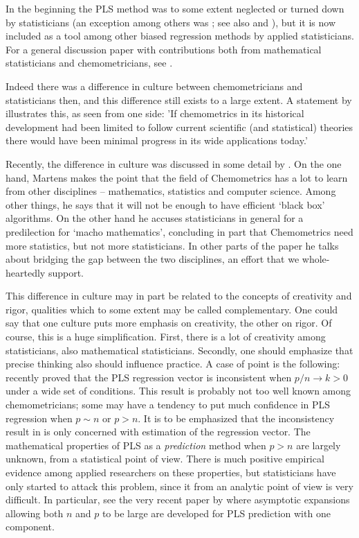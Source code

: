 \documentclass[num-refs]{wiley-article}
\begin{document}
In the beginning the PLS method was to some extent neglected or turned down by statisticians (an exception among others was \citep{frank1993statistical}; see also \citet{helland1988structure} and \citet{helland1990partial}), but it is now included as a tool among other biased regression methods by applied statisticians. For a general discussion paper with contributions both from mathematical statisticians and chemometricians, see \citet{sundberg1999multivariate}.

Indeed there was a difference in culture between chemometricians and statisticians then, and this difference still exists to a large extent. A statement by  \citet{munck2010physiochemical} illustrates this, as seen from one side: 'If chemometrics in its historical development had been limited to follow current scientific (and statistical) theories there would have been minimal progress in its wide applications today.'

Recently, the difference in culture was discussed in some detail by \citet{martens2015bigdata}. On the one hand, Martens makes the point that the field of Chemometrics has a lot to learn from other disciplines -- mathematics, statistics and computer science. Among other things, he says that it will not be enough to have efficient `black box' algorithms. On the other hand he accuses statisticians in general for a predilection for `macho mathematics', concluding in part that Chemometrics need more statistics, but not more statisticians. In other parts of the paper he talks about bridging the gap between the two disciplines, an effort that we whole-heartedly support.

This difference in culture may in part be related to the concepts of creativity and rigor, qualities which to some extent may be called complementary. One could say that one culture puts more emphasis on creativity, the other on rigor. Of course, this is a huge simplification. First, there is a lot of creativity among statisticians, also mathematical statisticians. Secondly, one should emphasize that precise thinking also should influence practice. A case of point is the following:   \citet{chung2010sparse} recently proved that the PLS regression vector is inconsistent when $p/n\rightarrow k>0$  under a wide set of conditions. This result is probably not too well known among chemometricians; some may have a tendency to put much confidence in PLS regression when $p\sim n$ or $p>n$. It is to be emphasized that the inconsistency result in \citep{chung2010sparse} is only concerned with estimation of the regression vector. The mathematical properties of PLS as a \emph{prediction} method when $p>n$ are largely unknown, from a statistical point of view. There is much positive empirical evidence among applied researchers on these properties, but statisticians have only started to attack this problem, since it from an analytic point of view is very difficult. In particular, see the very recent paper by \citet{cook2017pls} where asymptotic expansions allowing both $n$ and $p$ to be large are developed for PLS prediction with one component.
\end{document}
